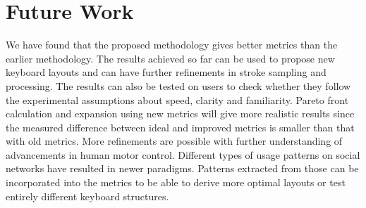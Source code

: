\documentclass[MTech]{iitmdiss}
\begin{document}
\chapter{Future Work}
We have found that the proposed methodology gives better metrics than the earlier methodology. The results achieved so far can be used to propose new keyboard layouts and can have further refinements in stroke sampling and processing. The results can also be tested on users to check whether they follow the experimental assumptions about speed, clarity and familiarity. Pareto front calculation and expansion using new metrics will give more realistic results since the measured difference between ideal and improved metrics is smaller than that with old metrics. More refinements are possible with further understanding of advancements in human motor control.
Different types of usage patterns on social networks have resulted in newer paradigms. Patterns extracted from those can be incorporated into the metrics to be able to derive more optimal layouts or test entirely different keyboard structures.


\begin{singlespace}
%	
	
\end{singlespace}
\end{document}
